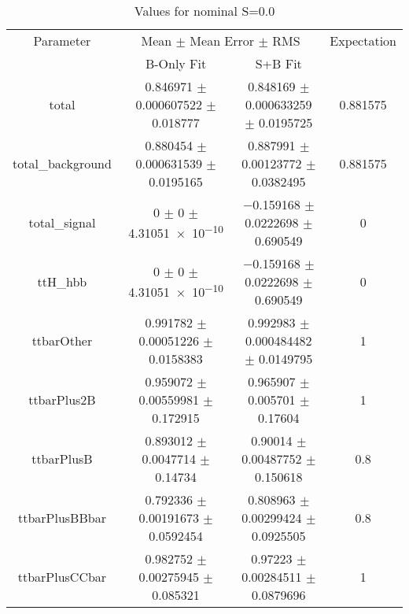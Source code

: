 \begin{table}
\centering
\caption{Values for nominal S=0.0}
\begin{tabular}{cccc}
\toprule
Parameter & \multicolumn{2}{c}{Mean $\pm$ Mean Error $\pm$ RMS} & Expectation\\
 & B-Only Fit & S+B Fit & \\
\midrule
total & \num{0.846971} $\pm$ \num{0.000607522} $\pm$ \num{0.018777} & \num{0.848169} $\pm$ \num{0.000633259} $\pm$ \num{0.0195725} & \num{0.881575}\\
total\_background & \num{0.880454} $\pm$ \num{0.000631539} $\pm$ \num{0.0195165} & \num{0.887991} $\pm$ \num{0.00123772} $\pm$ \num{0.0382495} & \num{0.881575}\\
total\_signal & \num{0} $\pm$ \num{0} $\pm$ \num{4.31051e-10} & \num{-0.159168} $\pm$ \num{0.0222698} $\pm$ \num{0.690549} & \num{0}\\
ttH\_hbb & \num{0} $\pm$ \num{0} $\pm$ \num{4.31051e-10} & \num{-0.159168} $\pm$ \num{0.0222698} $\pm$ \num{0.690549} & \num{0}\\
ttbarOther & \num{0.991782} $\pm$ \num{0.00051226} $\pm$ \num{0.0158383} & \num{0.992983} $\pm$ \num{0.000484482} $\pm$ \num{0.0149795} & \num{1}\\
ttbarPlus2B & \num{0.959072} $\pm$ \num{0.00559981} $\pm$ \num{0.172915} & \num{0.965907} $\pm$ \num{0.005701} $\pm$ \num{0.17604} & \num{1}\\
ttbarPlusB & \num{0.893012} $\pm$ \num{0.0047714} $\pm$ \num{0.14734} & \num{0.90014} $\pm$ \num{0.00487752} $\pm$ \num{0.150618} & \num{0.8}\\
ttbarPlusBBbar & \num{0.792336} $\pm$ \num{0.00191673} $\pm$ \num{0.0592454} & \num{0.808963} $\pm$ \num{0.00299424} $\pm$ \num{0.0925505} & \num{0.8}\\
ttbarPlusCCbar & \num{0.982752} $\pm$ \num{0.00275945} $\pm$ \num{0.085321} & \num{0.97223} $\pm$ \num{0.00284511} $\pm$ \num{0.0879696} & \num{1}\\
\bottomrule
\end{tabular}
\end{table}